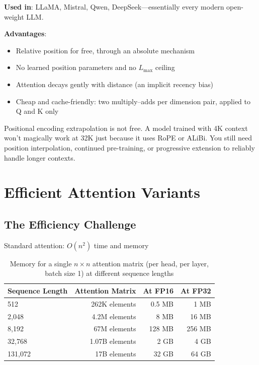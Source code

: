 \textbf{Used in}: LLaMA, Mistral, Qwen, DeepSeek---essentially every modern open-weight LLM.

\textbf{Advantages}:
\begin{itemize}
    \item Relative position for free, through an absolute mechanism
    \item No learned position parameters and no $L_{\max}$ ceiling
    \item Attention decays gently with distance (an implicit recency bias)
    \item Cheap and cache-friendly: two multiply--adds per dimension pair, applied to Q and K only
\end{itemize}

\begin{warningbox}
Positional encoding extrapolation is not free. A model trained with 4K context won't magically work at 32K just because it uses RoPE or ALiBi. You still need position interpolation, continued pre-training, or progressive extension to reliably handle longer contexts.
\end{warningbox}

\section{Efficient Attention Variants}
\label{sec:efficient_attention}

\subsection{The Efficiency Challenge}

Standard attention: $O(n^2)$ time and memory

\begin{table}[H]
\centering
\caption{Memory for a single $n \times n$ attention matrix (per head, per layer, batch size 1) at different sequence lengths}
\begin{tabular}{lrrr}
\toprule
\textbf{Sequence Length} & \textbf{Attention Matrix} & \textbf{At FP16} & \textbf{At FP32} \\
\midrule
512 & 262K elements & 0.5 MB & 1 MB \\
2,048 & 4.2M elements & 8 MB & 16 MB \\
8,192 & 67M elements & 128 MB & 256 MB \\
32,768 & 1.07B elements & 2 GB & 4 GB \\
131,072 & 17B elements & 32 GB & 64 GB \\
\bottomrule
\end{tabular}
\end{table}


